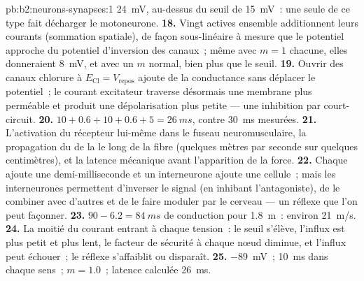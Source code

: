 \begin{solution}{pb:b2:neurons-synapses:1}
\qty{24}{mV}, au-dessus du seuil de \qty{15}{mV}~: une seule  de
ce type fait décharger le motoneurone.
\textbf{18.} Vingt  actives ensemble additionnent leurs courants
(sommation spatiale), de façon sous-linéaire à mesure que le potentiel
approche du potentiel d'inversion des canaux~; même avec $m = 1$ chacune,
elles donneraient \qty{8}{mV}, et avec un $m$ normal, bien plus que le seuil.
\textbf{19.} Ouvrir des canaux chlorure à $E_{\mathrm{Cl}} = V_{\text{repos}}$
ajoute de la conductance sans déplacer le potentiel~; le courant
excitateur traverse désormais une membrane plus perméable et produit une
dépolarisation plus petite --- une inhibition par court-circuit.
\textbf{20.} $10 + 0.6 + 10 + 0.6 + 5 = \qty{26}{ms}$, contre
\qty{30}{ms} mesurées.
\textbf{21.} L'activation du récepteur lui-même dans le fuseau
neuromusculaire, la propagation du  de la  le long de la fibre (quelques mètres par seconde sur quelques
centimètres), et la latence mécanique avant l'apparition de la force.
\textbf{22.} Chaque  ajoute une demi-milliseconde et un
interneurone ajoute une cellule~; mais les interneurones permettent
d'inverser le signal (en inhibant l'antagoniste), de le combiner avec
d'autres et de le faire moduler par le cerveau --- un réflexe que l'on
peut façonner.
\textbf{23.} $90 - 6.2 = \qty{84}{ms}$ de conduction pour \qty{1.8}{m}~:
environ \qty{21}{m/s}.
\textbf{24.} La moitié du courant entrant à chaque tension~: le seuil
s'élève, l'influx est plus petit et plus lent, le facteur de sécurité à
chaque nœud diminue, et l'influx peut échouer~; le réflexe s'affaiblit
ou disparaît.
\textbf{25.}  \qty{-89}{mV}~; \qty{10}{ms} dans chaque
sens~; $m = 1.0$~; latence calculée \qty{26}{ms}.
\end{solution}
